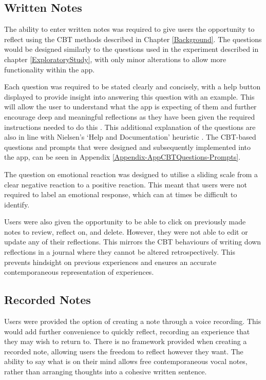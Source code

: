 \documentclass{l4proj}
\begin{document}
\subsection{Written Notes}

The ability to enter written notes was required to give users the opportunity to reflect using the CBT methods described in Chapter \ref{Background}. The questions would be designed similarly to the questions used in the experiment described in chapter \ref{ExploratoryStudy}, with only minor alterations to allow more functionality within the app. 

Each question was required to be stated clearly and concisely, with a help button displayed to provide insight into answering this question with an example. This will allow the user to understand what the app is expecting of them and further encourage deep and meaningful reflections as they have been given the required instructions needed to do this \citep{bruno_reflective_2018}. This additional explanation of the questions are also in line with Nielsen’s ‘Help and Documentation’ heuristic \citep{Nielsen10}. The CBT-based questions and prompts that were designed and subsequently implemented into the app, can be seen in Appendix \ref{Appendix-AppCBTQuestions-Prompts}.

The question on emotional reaction was designed to utilise a sliding scale from a clear negative reaction to a positive reaction. This meant that users were not required to label an emotional response, which can at times be difficult to identify. 

Users were also given the opportunity to be able to click on previously made notes to review, reflect on, and delete. However, they were not able to edit or update any of their reflections. This mirrors the CBT behaviours of writing down reflections in a journal where they cannot be altered retrospectively. This prevents hindsight on previous experiences and ensures an accurate contemporaneous representation of experiences.


\subsection{Recorded Notes}

Users were provided the option of creating a note through a voice recording. This would add further convenience to quickly reflect, recording an experience that they may wish to return to. There is no framework provided when creating a recorded note, allowing users the freedom to reflect however they want. The ability to say what is on their mind allows free contemporaneous vocal notes, rather than arranging thoughts into a cohesive written sentence.
\end{document}
